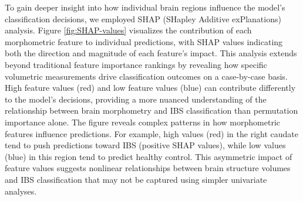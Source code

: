 \documentclass[diagnostics,article,accept,pdftex,moreauthors]{Definitions/mdpi}
\begin{document}
To gain deeper insight into how individual brain regions influence the model's classification decisions, we employed SHAP (SHapley Additive exPlanations) analysis. Figure \ref{fig:SHAP-values} visualizes the contribution of each morphometric feature to individual predictions, with SHAP values indicating both the direction and magnitude of each feature's impact. This analysis extends beyond traditional feature importance rankings by revealing how specific volumetric measurements drive classification outcomes on a case-by-case basis. High feature values (red) and low feature values (blue) can contribute differently to the model's decisions, providing a more nuanced understanding of the relationship between brain morphometry and IBS classification than permutation importance alone. The figure reveals complex patterns in how morphometric features influence predictions. For example, high values (red) in the right caudate tend to push predictions toward IBS (positive SHAP values), while low values (blue) in this region tend to predict healthy control. This asymmetric impact of feature values suggests nonlinear relationships between brain structure volumes and IBS classification that may not be captured using simpler univariate analyses.
\end{document}

